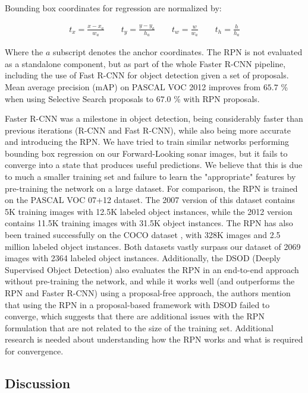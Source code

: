 Bounding box coordinates for regression are normalized by:

\begin{align*}
	t_x = \frac{x - x_a}{w_a} \qquad t_y = \frac{y - y_a}{h_a} \qquad t_w = \frac{w}{w_a} \qquad t_h = \frac{h}{h_a}
\end{align*}

Where the $a$ subscript denotes the anchor coordinates. The RPN is not evaluated as a standalone component, but as part of the whole Faster R-CNN pipeline, including the use of Fast R-CNN \cite{girshick2015fast} for object detection given a set of proposals. Mean average precision (mAP) on PASCAL VOC 2012 improves from $65.7$ \% when using Selective Search proposals to $67.0$ \% with RPN proposals.

Faster R-CNN was a milestone in object detection, being considerably faster than previous iterations (R-CNN and Fast R-CNN), while also being more accurate and introducing the RPN. We have tried to train similar networks performing bounding box regression on our Forward-Looking sonar images, but it fails to converge into a state that produces useful predictions. We believe that this is due to much a smaller training set and failure to learn the "appropriate" features by pre-training the network on a large dataset.
For comparison, the RPN is trained on the PASCAL VOC 07+12 dataset. The 2007 \cite[-3em]{everingham2010pascal} version of this dataset contains 5K training images with 12.5K labeled object instances, while the 2012 \cite[1em]{everingham2015pascal} version contains 11.5K training images with 31.5K object instances. The RPN has also been trained successfully on the COCO dataset \cite[1em]{lin2014microsoft}, with 328K images and 2.5 million labeled object instances. Both datasets vastly surpass our dataset of 2069 images with 2364 labeled object instances.
Additionally, the DSOD (Deeply Supervised Object Detection) \cite[1em]{shen2017dsod} also evaluates the RPN in an end-to-end approach without pre-training the network, and while it works well (and outperforms the RPN and Faster R-CNN) using a proposal-free approach, the authors mention that using the RPN in a proposal-based framework with DSOD failed to converge, which suggests that there are additional issues with the RPN formulation that are not related to the size of the training set. Additional research is needed about understanding how the RPN works and what is required for convergence.

\subsection{Discussion}

